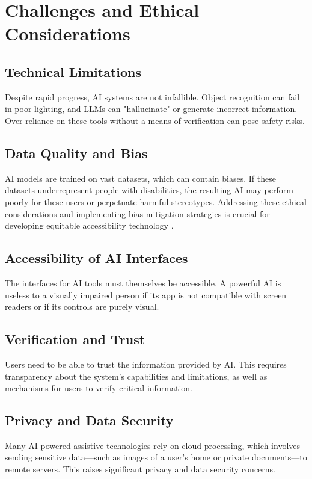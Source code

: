 \section{Challenges and Ethical Considerations}\label{ch9:sec:challenges}

\subsection{Technical Limitations}\label{ch9:ssec:technical-limitations}
Despite rapid progress, AI systems are not infallible. Object recognition can fail in poor lighting, and LLMs can "hallucinate" or generate incorrect information. Over-reliance on these tools without a means of verification can pose safety risks.

\subsection{Data Quality and Bias}\label{ch9:ssec:data-bias}
AI models are trained on vast datasets, which can contain biases. If these datasets underrepresent people with disabilities, the resulting AI may perform poorly for these users or perpetuate harmful stereotypes. Addressing these ethical considerations and implementing bias mitigation strategies is crucial for developing equitable accessibility technology \supercite{AIEthicsBias}.

\subsection{Accessibility of AI Interfaces}\label{ch9:ssec:ai-interfaces}
The interfaces for AI tools must themselves be accessible. A powerful AI is useless to a visually impaired person if its app is not compatible with screen readers or if its controls are purely visual.

\subsection{Verification and Trust}\label{ch9:ssec:verification-trust}
Users need to be able to trust the information provided by AI. This requires transparency about the system's capabilities and limitations, as well as mechanisms for users to verify critical information.

\subsection{Privacy and Data Security}\label{ch9:ssec:privacy}
Many AI-powered assistive technologies rely on cloud processing, which involves sending sensitive data—such as images of a user's home or private documents—to remote servers. This raises significant privacy and data security concerns.

